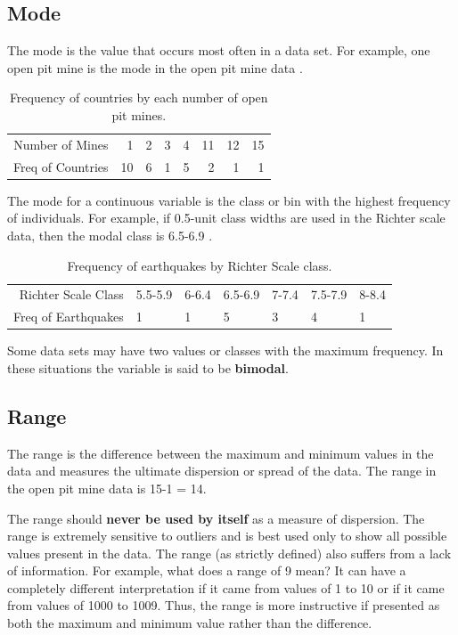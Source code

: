 \documentclass[10pt,openany]{book}\usepackage[]{graphicx}\usepackage[]{color}
\begin{document}
\subsection{Mode}
The mode is the value that occurs most often in a data set. For example, one open pit mine is the mode in the open pit mine data .

\begin{table}[ht]
\centering
\caption{Frequency of countries by each number of open pit mines.} 
\label{tab:MCmode}
\begin{tabular}{rrrrrrrr}
   \hline
Number of Mines & 1 & 2 & 3 & 4 & 11 & 12 & 15 \\ 
  Freq of Countries & 10 & 6 & 1 & 5 & 2 & 1 & 1 \\ 
   \hline
\end{tabular}
\end{table}


The mode for a continuous variable is the class or bin with the highest frequency of individuals. For example, if 0.5-unit class widths are used in the Richter scale data, then the modal class is 6.5-6.9 .

\begin{table}[ht]
\centering
\caption{Frequency of earthquakes by Richter Scale class.} 
\label{tab:EQmode}
\begin{tabular}{rllllll}
   \hline
Richter Scale Class & 5.5-5.9 & 6-6.4 & 6.5-6.9 & 7-7.4 & 7.5-7.9 & 8-8.4 \\ 
  Freq of Earthquakes & 1 & 1 & 5 & 3 & 4 & 1 \\ 
   \hline
\end{tabular}
\end{table}


Some data sets may have two values or classes with the maximum frequency. In these situations the variable is said to be \textbf{bimodal}.

\subsection{Range}
The range is the difference between the maximum and minimum values in the data and measures the ultimate dispersion or spread of the data. The range in the open pit mine data is 15-1 = 14.

The range should \textbf{never be used by itself} as a measure of dispersion. The range is extremely sensitive to outliers and is best used only to show all possible values present in the data. The range (as strictly defined) also suffers from a lack of information. For example, what does a range of 9 mean?  It can have a completely different interpretation if it came from values of 1 to 10 or if it came from values of 1000 to 1009. Thus, the range is more instructive if presented as both the maximum and minimum value rather than the difference.
\end{document}
